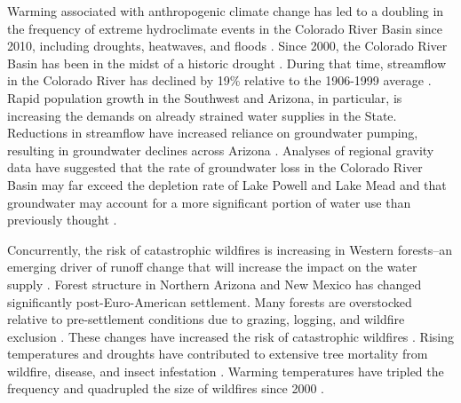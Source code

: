 \documentclass[
  number,
  preprint,
  3p,
  onecolumn]{elsarticle}
\begin{document}
Warming associated with anthropogenic climate change has led to a
doubling in the frequency of extreme hydroclimate events in the Colorado
River Basin since 2010, including droughts, heatwaves, and floods
\citep{bennett_concurrent_2021}. Since 2000, the Colorado River Basin
has been in the midst of a historic drought
\citep{meko_treering_2022, williams_rapid_2022}. During that time,
streamflow in the Colorado River has declined by 19\% relative to the
1906-1999 average \citep{hogan_recent_2024, udall_twentyfirst_2017}.
Rapid population growth in the Southwest and Arizona, in particular, is
increasing the demands on already strained water supplies in the State.
Reductions in streamflow have increased reliance on groundwater pumping,
resulting in groundwater declines across Arizona
\citep{tadych_historical_2024}. Analyses of regional gravity data have
suggested that the rate of groundwater loss in the Colorado River Basin
may far exceed the depletion rate of Lake Powell and Lake Mead and that
groundwater may account for a more significant portion of water use than
previously thought \citep{castle2014}.

Concurrently, the risk of catastrophic wildfires is increasing in
Western forests--an emerging driver of runoff change that will increase
the impact on the water supply \citep{williams_rapid_2022}. Forest
structure in Northern Arizona and New Mexico has changed significantly
post-Euro-American settlement. Many forests are overstocked relative to
pre-settlement conditions due to grazing, logging, and wildfire
exclusion \citep{covington_southwestern_1994, friederici2013}. These
changes have increased the risk of catastrophic wildfires
\citep{allen_ecological_2002}. Rising temperatures and droughts have
contributed to extensive tree mortality from wildfire, disease, and
insect infestation \citep{berner_tree_2017}. Warming temperatures have
tripled the frequency and quadrupled the size of wildfires since 2000
\citep{iglesias2022}.
\end{document}
